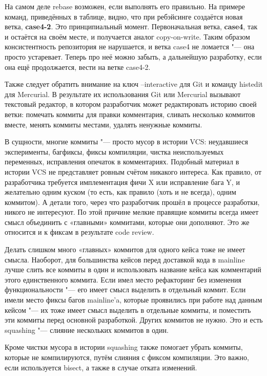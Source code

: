 \documentclass[10pt, a5paper]{article}
\begin{document}
На самом деле rebase возможен, если выполнять его правильно. На примере команд, приведённых в таблице, видно, что при ребэйсинге создаётся новая ветка, \textbf{case4-2}. Это принципиальный момент. Первоначальная ветка, \textbf{case4}, так и остаётся на своём месте, и получается аналог copy-on-write. Таким образом консистентность репозитория не нарушается, и ветка case4 не ломается "--- она просто устаревает. Теперь про неё можно забыть, а дальнейшую разработку, если она ещё продолжается, вести на ветке case4-2.

Также следует обратить внимание на ключ --interactive для Git и команду histedit для Mercurial. В результате их использования Git или Mercurial вызывают текстовый редактор, в котором разработчик может редактировать историю своей ветки: помечать коммиты для правки комментария, сливать несколько коммитов вместе, менять коммиты местами, удалять ненужные коммиты.

В сущности, многие коммиты "--- просто мусор в истории VCS: неудавшиеся эксперименты, багфиксы, фиксы компиляции, чистка неиспользуемых переменных, исправления опечаток в комментариях. Подобный материал в истории VCS не представляет ровным счётом никакого интереса. Как правило, от разработчика требуется имплементация фичи X или исправление бага Y, и желательно одним куском (то есть, как правило (хоть и не всегда), одним коммитом). А детали того, через что разработчик прошёл в процессе разработки, никого не интересуют. По этой причине мелкие правящие коммиты всегда имеет смысл объединить с «главными» коммитами, которые они дополняют. Это же относится и к фиксам в результате code review.

Делать слишком много «главных» коммитов для одного кейса тоже не имеет смысла. Наоборот, для большинства кейсов перед доставкой кода в mainline лучше слить все коммиты в один и использовать название кейса как комментарий этого единственного коммита. Если имел место рефакторинг без изменения функциональности "--- его имеет смысл выделить в отдельный коммит. Если имели место фиксы багов mainline'a, которые проявились при работе над данным кейсом "--- их тоже имеет смысл выделить в отдельные коммиты, и поместить эти коммиты перед основной разработкой. Других коммитов не нужно. Это и есть squashing "--- слияние нескольких коммитов в один.

Кроме чистки мусора в истории squashing также помогает убрать коммиты, которые не компилируются, путём слияния с фиксом компиляции. Это важно, если  используется bisect, а также в случае отката изменений.
\end{document}
